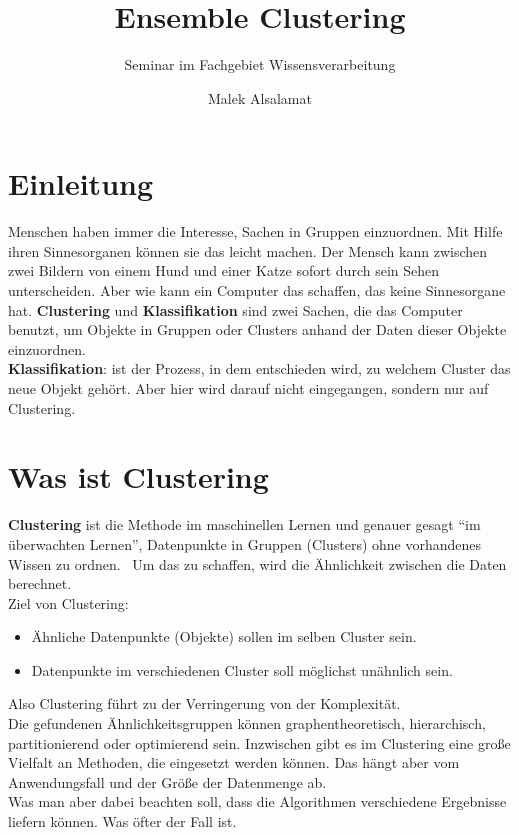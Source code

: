 \documentclass[runningheads]{llncs}
\title{Ensemble Clustering}
\subtitle{Seminar im Fachgebiet Wissensverarbeitung}
\author{Malek Alsalamat}
\institute{Universität Kassel}
\begin{document}
\maketitle	

\section{Einleitung}
Menschen haben immer die Interesse, Sachen in Gruppen einzuordnen. Mit Hilfe ihren Sinnesorganen können sie das leicht machen. Der Mensch kann zwischen zwei Bildern von einem Hund und einer Katze sofort durch sein Sehen unterscheiden. Aber wie kann ein Computer das schaffen, das keine Sinnesorgane hat. \textbf{Clustering} und \textbf{Klassifikation } sind zwei Sachen, die das Computer benutzt, um Objekte in Gruppen oder Clusters anhand der Daten dieser Objekte einzuordnen.\\[4pt]
\textbf{Klassifikation}: ist der Prozess, in dem entschieden wird, zu welchem Cluster das neue Objekt gehört. Aber hier wird darauf nicht eingegangen, sondern nur auf Clustering.  
\section{Was ist Clustering}
\textbf{Clustering} ist die Methode im maschinellen Lernen und genauer gesagt “im überwachten Lernen”, Datenpunkte in Gruppen (Clusters) ohne vorhandenes Wissen zu ordnen.  Um das zu schaffen, wird die Ähnlichkeit zwischen die Daten berechnet.\\[4pt]
Ziel von Clustering: 
\begin{itemize}
	\item Ähnliche Datenpunkte (Objekte) sollen im selben Cluster sein. 
	\item Datenpunkte im verschiedenen Cluster soll möglichst unähnlich sein.   
\end{itemize}
Also Clustering führt zu der Verringerung von der Komplexität.\\[4pt]
Die gefundenen Ähnlichkeitsgruppen können graphentheoretisch, hierarchisch, partitionierend oder optimierend sein. Inzwischen gibt es im Clustering eine große Vielfalt an Methoden, die eingesetzt werden können. Das hängt aber vom Anwendungsfall und der Größe der Datenmenge ab.\\[4pt]
Was man aber dabei beachten soll, dass die Algorithmen verschiedene Ergebnisse liefern können. Was öfter der Fall ist. 
\end{document}

